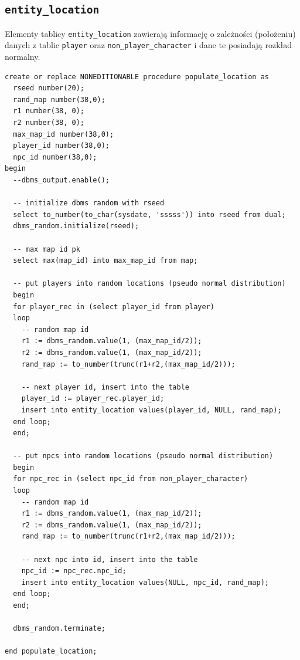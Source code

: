 \documentclass[11pt]{article}
\begin{document}
\subsection{\texttt{entity\_location}}
\label{sec:org8ea4f2a}
Elementy tablicy \texttt{entity\_location} zawierają informację o zależności (położeniu)
danych z tablic \texttt{player} oraz \texttt{non\_player\_character} i dane te posiadają rozkład normalny.
\begin{verbatim}
create or replace NONEDITIONABLE procedure populate_location as
  rseed number(20);
  rand_map number(38,0);
  r1 number(38, 0);
  r2 number(38, 0);
  max_map_id number(38,0);
  player_id number(38,0);
  npc_id number(38,0);
begin
  --dbms_output.enable();

  -- initialize dbms random with rseed
  select to_number(to_char(sysdate, 'sssss')) into rseed from dual;
  dbms_random.initialize(rseed);

  -- max map id pk
  select max(map_id) into max_map_id from map;

  -- put players into random locations (pseudo normal distribution)
  begin
  for player_rec in (select player_id from player)
  loop
    -- random map id
    r1 := dbms_random.value(1, (max_map_id/2));
    r2 := dbms_random.value(1, (max_map_id/2));
    rand_map := to_number(trunc(r1+r2,(max_map_id/2)));

    -- next player id, insert into the table
    player_id := player_rec.player_id;
    insert into entity_location values(player_id, NULL, rand_map);
  end loop;
  end;

  -- put npcs into random locations (pseudo normal distribution)
  begin
  for npc_rec in (select npc_id from non_player_character)
  loop
    -- random map id
    r1 := dbms_random.value(1, (max_map_id/2));
    r2 := dbms_random.value(1, (max_map_id/2));
    rand_map := to_number(trunc(r1+r2,(max_map_id/2)));

    -- next npc into id, insert into the table
    npc_id := npc_rec.npc_id;
    insert into entity_location values(NULL, npc_id, rand_map);
  end loop;
  end;

  dbms_random.terminate;

end populate_location;
\end{verbatim}
\end{document}
